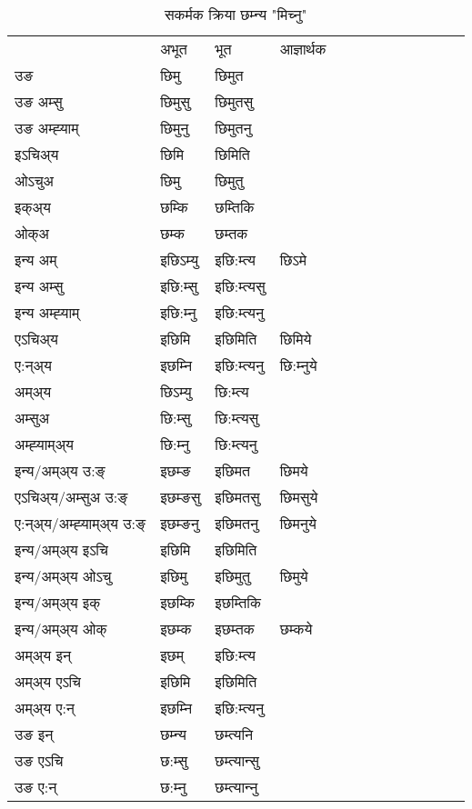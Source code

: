 \begin{table}[H]
\label{im.vt} \centering
\caption{सकर्मक क्रिया  छम्‍न्य  "मिच्नु"  }
\begin{tabular}{l|l|l|l|l|l|l|l|l|l|l|l|l}  \toprule
&अभूत & भूत & आज्ञार्थक \\ 
उङ &छिमु &छिमुत \\ 
उङ अम्सु &छिमुसु &छिमुतसु \\ 
उङ अम्ह्‍याम् &छिमुनु &छिमुतनु \\ 
इऽचिअ्य &छिमि &छिमिति   \\ 
ओऽचुअ &छिमु &छिमुतु   \\ 
इक्अ्य &छम्कि &छम्तिकि   \\ 
ओक्अ &छम्क &छम्तक   \\ 
इन्य अम् & इछिऽम्यु  & इछि:म्त्य &छिऽमे  \\ 
इन्य अम्सु & इछि:म्सु  & इछि:म्त्यसु   \\ 
इन्य अम्ह्‍याम् & इछि:म्‍नु  & इछि:म्त्यनु   \\ 
एऽचिअ्य & इछिमि & इछिमिति &छिमिये    \\ 
ए:न्अ्य & इछम्‍नि  & इछि:म्त्यनु &छि:म्‍नुये  \\ 
अम्अ्य & छिऽम्यु  & छि:म्त्य  \\ 
अम्सुअ & छि:म्सु & छि:म्त्यसु  \\ 
अम्ह्‍याम्अ्य & छि:म्‍नु  & छि:म्त्यनु \\ 
\midrule
इन्य/अम्अ्य उ:ङ्‌&इछम्ङ & इछिमत &छिमये \\ 
एऽचिअ्य/अम्सुअ उ:ङ्‌ &इछम्ङसु & इछिमतसु &छिमसुये \\ 
ए:न्अ्य/अम्ह्‍याम्अ्य उ:ङ्‌ &इछम्ङनु & इछिमतनु &छिमनुये \\ 
इन्य/अम्अ्य इऽचि & इछिमि & इछिमिति    \\ 
इन्य/अम्अ्य ओऽचु & इछिमु & इछिमुतु  &छिमुये  \\ 
इन्य/अम्अ्य इक् & इछम्कि & इछम्तिकि   \\ 
इन्य/अम्अ्य ओक् & इछम्क & इछम्तक  &छम्कये  \\ 
अम्अ्य इन् & इछम् & इछि:म्त्य   \\ 
अम्अ्य एऽचि & इछिमि & इछिमिति    \\ 
अम्अ्य ए:न् & इछम्‍नि  & इछि:म्त्यनु  \\ 
\midrule
उङ इन् & छम्‍न्य  & छम्त्यनि  \\ 
उङ एऽचि & छ:म्सु  & छम्त्यान्सु   \\ 
उङ ए:न्& छ:म्‍नु  & छम्त्यान्‍नु   \\ 
\bottomrule
\end{tabular}
\end{table}


